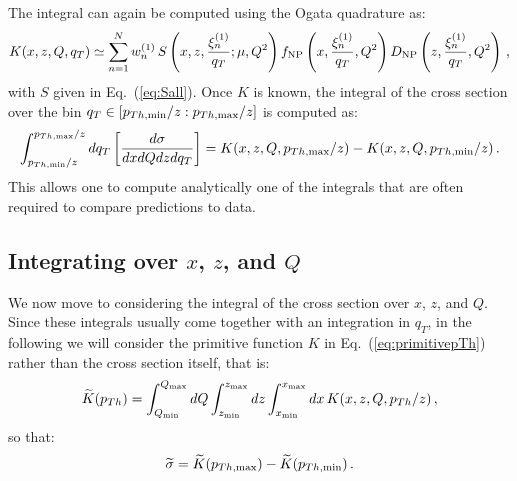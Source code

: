 \documentclass[10pt,a4paper]{article}
\begin{document}
The integral can again be computed using the Ogata quadrature as:
\begin{equation}\label{eq:primitivepTh}
\displaystyle   K(x,z,Q,q_{T}) \simeq \displaystyle
  \sum_{n=1}^N w_n^{(1)}
         \,S\left(x,z,\frac{\xi_n^{(1)}}{q_{T}};\mu,Q^2\right) f_{\rm NP}\left(x, \frac{\xi_n^{(1)}}{q_{T}},Q^2\right) D_{\rm NP}\left(z, \frac{\xi_n^{(1)}}{q_{T}},Q^2\right)\,,
\end{equation}
with $S$ given in Eq.~(\ref{eq:Sall}). Once $K$ is known, the integral
of the cross section over the bin
$q_{T}\in [p_{Th,\rm min}/z: p_{Th,\rm max}/z]$ is computed as:
\begin{equation}
  \int_{p_{Th,\rm min}/z}^{p_{Th,\rm max}/z} dq_{T}\left[\frac{d\sigma}{dxdQdz d
      q_{T}}\right]=K(x,z,Q, p_{Th,\rm max}/z)-K(x,z,Q, p_{Th,\rm min}/z)\,.
\end{equation}
This allows one to compute analytically one of the integrals that are
often required to compare predictions to data. 

\subsection{Integrating over $x$, $z$, and $Q$}

We now move to considering the integral of the cross section over $x$,
$z$, and $Q$. Since these integrals usually come together with an
integration in $q_{T}$, in the following we will consider the
primitive function $K$ in Eq.~(\ref{eq:primitivepTh}) rather than the
cross section itself, that is:
\begin{equation}\label{eq:IntcrosssectionSIDISPrim}
  \widetilde{K}(p_{Th})=\int_{Q_{\rm min}}^{Q_{\rm max}}dQ \int_{z_{\rm
      min}}^{z_{\rm max}}dz \int_{x_{\rm min}}^{x_{\rm max}}dx\,
  K(x,z,Q,p_{Th}/z)\,,
\end{equation}
so that:
\begin{equation}
  \widetilde{\sigma}=\widetilde{K}(p_{Th,\rm max})-\widetilde{K}(p_{Th,\rm min})\,.
\end{equation}
\end{document}

